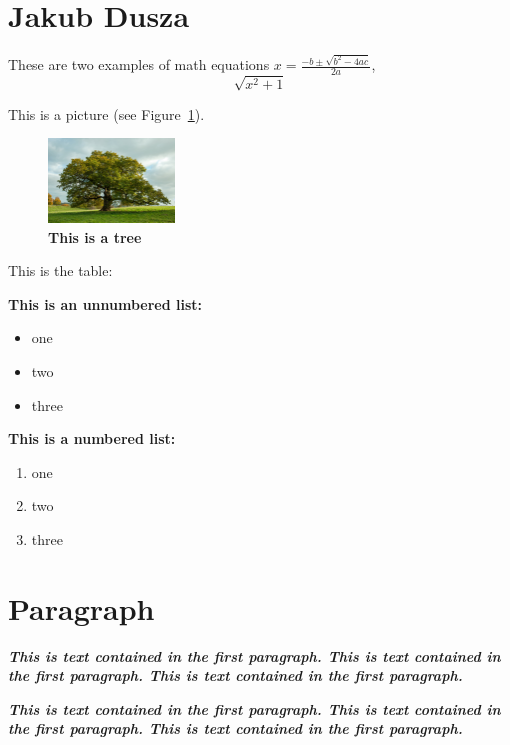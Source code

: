 \newpage
\section{Jakub Dusza}
These are two examples of math equations \( x = \frac{-b \pm \sqrt{b^2 - 4ac}}{2a} \), \[ \sqrt{x^2 + 1} \]

This is a picture (see Figure~\ref{fig:tree}).

\begin{figure}[htbp] 
    \centering
    \includegraphics[width=0.3\textwidth]{pictures/drzewo.jpeg}
    \caption{\textbf{This is a tree}}
    \label{fig:tree}
\end{figure}

This is the table:


\textbf{This is an unnumbered list:}
\begin{itemize}
    \item one
    \item two
    \item three
\end{itemize}

\textbf{This is a numbered list: }  
\begin{enumerate}
    \item one
    \item two
    \item three
\end{enumerate}

\section*{Paragraph}

\begin{flushright}
\textbf{\textit{This is text contained in the first paragraph. This is text contained in the first paragraph. This is text contained in the first paragraph.}}
\end{flushright}

\textbf{\textit{This is text contained in the first paragraph. This is text contained in the first paragraph. This is text contained in the first paragraph.}}